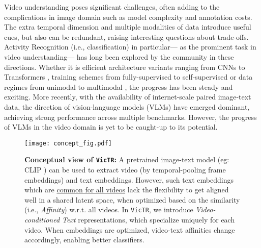 \documentclass[10pt,twocolumn,letterpaper]{article}
\newcommand{\ours}{\texttt{VicTR}}
\begin{document}
Video understanding poses significant challenges, often adding to the complications in image domain such as model complexity and annotation costs. The extra temporal dimension and multiple modalities of data introduce useful cues, but also can be redundant, raising interesting questions about trade-offs. Activity Recognition (i.e., classification) in particular--- as the prominent task in video understanding--- has long been explored by the community in these directions. Whether it is efficient architecture variants ranging from CNNs \cite{lin2019tsm, feichtenhofer2020x3d, ryoo2019assemblenet} to Transformers \cite{arnab2021vivit, bertasius2021timesformer, fan2021mvit}, training schemes from fully-supervised \cite{carreira2017i3d, feichtenhofer2019slowfast} to self-supervised \cite{qian2021spatiotemporal, feichtenhofer2021large, recasens2021brave} or data regimes from unimodal \cite{xie2017s3d, tran2018r2p1d} to multimodal \cite{han2020self, nagrani2021bottleneck}, the progress has been steady and exciting. More recently, with the availability of internet-scale paired image-text data, the direction of vision-language models (VLMs) \cite{radford2021clip, jia2021align} have emerged dominant, achieving strong performance across multiple benchmarks. However, the progress of VLMs in the video domain is yet to be caught-up to its potential.

\begin{figure}[t!]
    \centering
    \texttt{[image: concept\_fig.pdf]}
    \caption{\textbf{Conceptual view of \ours:} A pretrained image-text model (eg: CLIP \cite{radford2021clip}) can be used to extract video (by temporal-pooling frame embeddings) and text embeddings. However, such text embeddings which are \underline{common for all videos} lack the flexibility to get aligned well in a shared latent space, when optimized based on the similarity (i.e., \textit{Affinity}) w.r.t. all videos. In \ours, we introduce \textit{Video-conditioned Text} representations, which specialize uniquely for each video. When embeddings are optimized, video-text affinities change accordingly, enabling better classifiers.
    }
    \vspace{-2mm}
    \label{fig:concept}
\end{figure}
        
\end{document}
